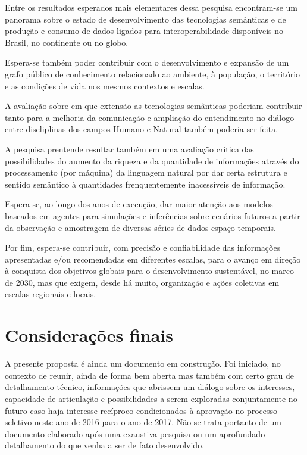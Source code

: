 \documentclass[
	12pt,				%
	openany,			%
	oneside,			%
	a4paper,			%
	english,			%
	french,				%
	spanish,			%
	brazil,				%
	]{abntex2}
\begin{document}
Entre os resultados esperados mais elementares dessa pesquisa encontram-se um panorama sobre o estado de desenvolvimento das tecnologias semânticas e de produção e consumo de dados ligados para interoperabilidade disponíveis no Brasil, no continente ou no globo.

Espera-se também poder contribuir com o desenvolvimento e expansão de um grafo público de conhecimento relacionado ao ambiente, à população, o território e as condições de vida nos mesmos contextos e escalas.

A avaliação sobre em que extensão as tecnologias semânticas poderiam contribuir tanto para a melhoria da comunicação e ampliação do entendimento no diálogo entre discliplinas dos campos Humano e Natural também poderia ser feita.

A pesquisa prentende resultar também em uma avaliação crítica das possibilidades do aumento da riqueza e da quantidade de informações através do processamento (por máquina) da linguagem natural por dar certa estrutura e sentido semântico à quantidades frenquentemente inacessíveis de informação.

Espera-se, ao longo dos anos de execução, dar maior atenção aos modelos baseados em agentes para simulações e inferências sobre cenários futuros a partir da observação e amostragem de diversas séries de dados espaço-temporais.

Por fim, espera-se contribuir, com precisão e confiabilidade das informações apresentadas e/ou recomendadas em diferentes escalas, para o avanço em direção à conquista dos objetivos globais para o desenvolvimento sustentável, no marco de 2030, mas que exigem, desde há muito, organização e ações coletivas em escalas regionais e locais.


\chapter*[Considerações finais]{Considerações finais}

A presente proposta é ainda um documento em construção. Foi iniciado, no contexto de reunir, ainda de forma bem aberta mas também com certo grau de detalhamento técnico, informações que abrissem um diálogo sobre os interesses, capacidade de articulação e possibilidades a serem exploradas conjuntamente no futuro caso haja interesse recíproco condicionados à aprovação no processo seletivo neste ano de 2016 para o ano de 2017. Não se trata portanto de um documento elaborado após uma exaustiva pesquisa ou um aprofundado detalhamento do que venha a ser de fato desenvolvido.
\end{document}
